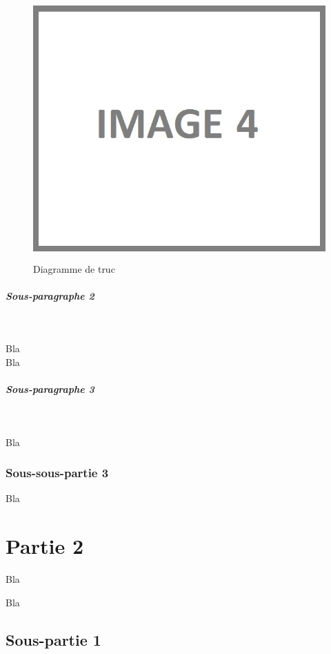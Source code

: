 \begin{figure}[H]
\begin{center}
\includegraphics[height=10cm]{autre_partie/image4}
\end{center}
\caption{Diagramme de truc}
\end{figure}

\subparagraph{Sous-paragraphe 2}
~\\
\hskip7mm

Bla\\

Bla

\subparagraph{Sous-paragraphe 3}
~\\
\hskip7mm

Bla

\subsubsection{Sous-sous-partie 3}

Bla

\section{Partie 2}

Bla


Bla

\subsection{Sous-partie 1}


